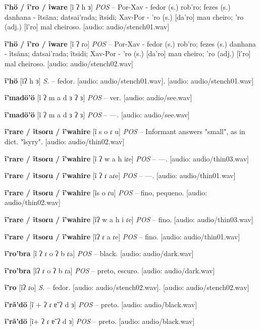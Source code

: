 \textbf{ĩ'hö / ĩ'ro / ĩware} [ĩ ʔ h ɜ] \textit{POS} -- Por-Xav - fedor (s.) rob'ro; fezes (s.) danhana - ĩtsãna; datsai'rada; ĩtsidi; Xav-Por - 'ro (s.) [da'ro] mau cheiro; 'ro (adj.) [ĩ'ro] mal cheiroso. [audio: audio/stench01.wav]{\faHeadphones}

\textbf{ĩ'hö / ĩ'ro / ĩware} [ĩ ʔ ɾo] \textit{POS} -- Por-Xav - fedor (s.) rob'ro; fezes (s.) danhana - ĩtsãna; datsai'rada; ĩtsidi; Xav-Por - 'ro (s.) [da'ro] mau cheiro; 'ro (adj.) [ĩ'ro] mal cheiroso. [audio: audio/stench02.wav]{\faHeadphones}

\textbf{ĩ'hö} [ĩʔ h ɜ] \textit{S.} -- fedor. [audio: audio/stench01.wav]{\faHeadphones}. [audio: audio/stench01.wav]{\faHeadphones}

\textbf{ĩ'madö'ö} [ĩ ʔ m a d ɜ ʔ ɜ] \textit{POS} -- ver. [audio: audio/see.wav]{\faHeadphones}

\textbf{ĩ'madö'ö} [ĩ ʔ m a d ɜ ʔ ɜ] \textit{POS} -- —. [audio: audio/see.wav]{\faHeadphones}

\textbf{ĩ'rare / ĩtsoɾu / ĩ'wahire} [ĩ s o ɾ u] \textit{POS} -- Informant answers "small", as in dict. "ĩsyry". [audio: audio/thin02.wav]{\faHeadphones}

\textbf{ĩ'rare / ĩtsoɾu / ĩ'wahire} [ĩ ʔ w a h iɾe] \textit{POS} -- —. [audio: audio/thin03.wav]{\faHeadphones}

\textbf{ĩ'rare / ĩtsoɾu / ĩ'wahire} [ĩ ʔ ɾ aɾe] \textit{POS} -- —. [audio: audio/thin01.wav]{\faHeadphones}

\textbf{ĩ'rare / ĩtsoɾu / ĩ'wahire} [ĩs o ɾu] \textit{POS} -- fino, pequeno. [audio: audio/thin02.wav]{\faHeadphones}

\textbf{ĩ'rare / ĩtsoɾu / ĩ'wahire} [ĩʔ w a h i ɾe] \textit{POS} -- fino. [audio: audio/thin03.wav]{\faHeadphones}

\textbf{ĩ'rare / ĩtsoɾu / ĩ'wahire} [ĩʔ ɾ a ɾe] \textit{POS} -- fino. [audio: audio/thin01.wav]{\faHeadphones}

\textbf{ĩ'ro'bra} [ĩ ʔ ɾ o ʔ b ɾa] \textit{POS} -- black. [audio: audio/dark.wav]{\faHeadphones}

\textbf{ĩ'ro'bra} [ĩʔ ɾ o ʔ b ɾa] \textit{POS} -- preto, escuro. [audio: audio/dark.wav]{\faHeadphones}

\textbf{ĩ'ro} [ĩʔ ɾo] \textit{S.} -- fedor. [audio: audio/stench02.wav]{\faHeadphones}. [audio: audio/stench02.wav]{\faHeadphones}

\textbf{ĩ'rã'dö} [ĩ + ʔ ɾ ɐ̃ ʔ d ɜ] \textit{POS} -- preto. [audio: audio/black.wav]{\faHeadphones}

\textbf{ĩ'rã'dö} [ĩ+ ʔ ɾ ɐ̃ ʔ d ɜ] \textit{POS} -- preto. [audio: audio/black.wav]{\faHeadphones}

